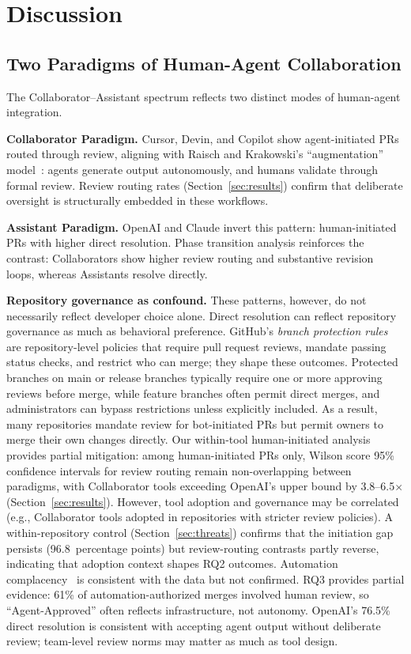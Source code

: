 \documentclass[sigconf]{acmart}
\begin{document}
\section{Discussion}
\label{sec:discussion}

\subsection{Two Paradigms of Human-Agent Collaboration}

The Collaborator--Assistant spectrum reflects two distinct modes
of human-agent integration.

\textbf{Collaborator Paradigm.}
Cursor, Devin, and Copilot show agent-initiated PRs routed
through review, aligning with Raisch and Krakowski's
``augmentation'' model~\cite{raisch2021automation}: agents
generate output autonomously, and humans validate through formal
review.
Review routing rates (Section~\ref{sec:results}) confirm that deliberate oversight is structurally embedded in these workflows.

\textbf{Assistant Paradigm.}
OpenAI and Claude invert this pattern: human-initiated PRs with
higher direct resolution.
Phase transition analysis reinforces the contrast: Collaborators
show higher review routing and substantive revision loops, whereas
Assistants resolve directly.

\textbf{Repository governance as confound.}
These patterns, however, do not necessarily reflect developer
choice alone.
Direct resolution can reflect repository governance as much as
behavioral preference.
GitHub's \emph{branch protection rules}~\cite{github2024branchprotection}
are repository-level policies that require pull request reviews, mandate passing
status checks, and restrict who can merge; they shape these outcomes.
Protected branches on main or release branches typically require
one or more approving reviews before merge, while feature branches
often permit direct merges, and administrators can bypass
restrictions unless explicitly included.
As a result, many repositories mandate review for bot-initiated
PRs but permit owners to merge their own changes directly.
Our within-tool human-initiated analysis provides partial
mitigation: among human-initiated PRs only, Wilson score 95\%
confidence intervals for review routing remain non-overlapping
between paradigms, with Collaborator tools exceeding OpenAI's
upper bound by 3.8--6.5$\times$
(Section~\ref{sec:results}).
However, tool adoption and governance may be correlated
(e.g., Collaborator tools adopted in repositories with stricter
review policies).
A within-repository control (Section~\ref{sec:threats}) confirms that the initiation gap persists (96.8~percentage points) but review-routing contrasts partly reverse, indicating that adoption context shapes RQ2 outcomes.
Automation
complacency~\cite{okamura2020trust,glikson2020trust} is
consistent with the data but not confirmed.
RQ3 provides partial evidence: 61\% of automation-authorized
merges involved human review, so ``Agent-Approved'' often
reflects infrastructure, not autonomy.
OpenAI's 76.5\% direct resolution is consistent with
accepting agent output without deliberate review; team-level review norms may
matter as much as tool design.
\end{document}
